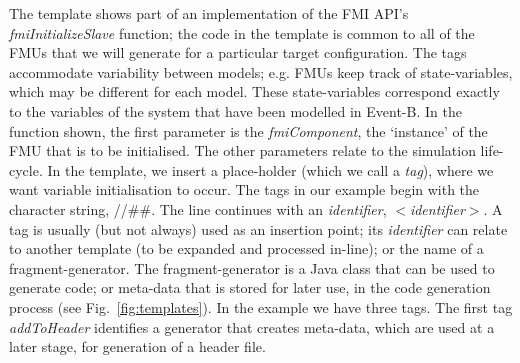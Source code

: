 \documentclass{llncs}%
\begin{document}
%
%
The template shows part of an implementation of the FMI API's \emph{fmiInitializeSlave} function; the code in the template is common to all of the FMUs that we will generate for a particular target configuration. The tags accommodate variability between models; e.g. FMUs keep track of state-variables, which may be different for each model. These state-variables correspond exactly to the variables of the system that have been modelled in Event-B. In the function shown, the first parameter is the \emph{fmiComponent}, the `instance' of the FMU that is to be initialised. The other parameters relate to the simulation life-cycle.  
In the template, we insert a place-holder (which we call a \emph{tag}), where we want variable initialisation to occur. The tags in our example begin with the character string, //\#\#.  The line continues with an \emph{identifier}, $<$\emph{identifier}$>$. A tag is usually (but not always) used as an insertion point; its \emph{identifier} can relate to another template (to be expanded and processed in-line); or the name of a fragment-generator. The fragment-generator is a Java class that can be used to generate code; or meta-data that is stored for later use, in the code generation process  (see Fig.~\ref{fig:templates}). In the example we have three tags. The first tag \emph{addToHeader} identifies a generator that creates meta-data, which are used at a later stage, for generation of a header file.
\end{document}
